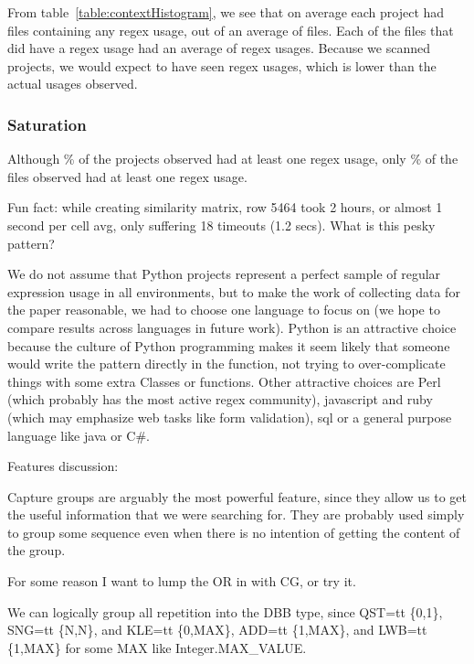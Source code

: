 From table~\ref{table:contextHistogram}, we see that on average each project had  files containing any regex usage, out of an average of  files.  Each of the files that did have a regex usage had an average of  regex usages.  Because we scanned  projects, we would expect to have seen  regex usages, which is lower than the actual  usages observed.
\subsubsection{Saturation}Although \% of the projects observed had at least one regex usage, only \% of the files observed had at least one regex usage.



Fun fact: while creating similarity matrix, row 5464 took 2 hours, or almost 1 second per cell avg, only suffering 18 timeouts (1.2 secs).  What is this pesky pattern?

We do not assume that Python projects represent a perfect sample of regular expression usage in all environments, but to make the work of collecting data for the paper reasonable, we had to choose one language to focus on (we hope to compare results across languages in future work).  Python is an attractive choice because the culture of Python programming makes it seem likely that someone would write the pattern directly in the function, not trying to over-complicate things with some extra Classes or functions.  Other attractive choices are Perl (which probably has the most active regex community), javascript and ruby (which may emphasize web tasks like form validation), sql or a general purpose language like java or C\#.

Features discussion:

Capture groups are arguably the most powerful feature, since they allow us to get the useful information that we were searching for.  They are probably used simply to group some sequence even when there is no intention of getting the content of the group.

For some reason I want to lump the OR in with CG, or try it.

We can logically group all repetition into the DBB type, since QST={tt \{0,1\}}, SNG={tt \{N,N\}}, and KLE={tt \{0,MAX\}}, ADD={tt \{1,MAX\}}, and LWB={tt \{1,MAX\}} for some MAX like Integer.MAX\_VALUE.

